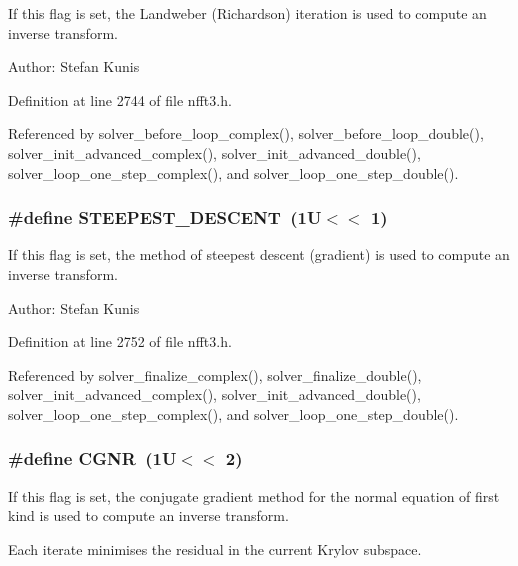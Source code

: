 If this flag is set, the Landweber (Richardson) iteration is used to compute an inverse transform. 

\begin{Desc}
\item[Author:]Stefan Kunis \end{Desc}


Definition at line 2744 of file nfft3.h.

Referenced by solver\_\-before\_\-loop\_\-complex(), solver\_\-before\_\-loop\_\-double(), solver\_\-init\_\-advanced\_\-complex(), solver\_\-init\_\-advanced\_\-double(), solver\_\-loop\_\-one\_\-step\_\-complex(), and solver\_\-loop\_\-one\_\-step\_\-double().\hypertarget{group__solver_g1f016d06d661c80eacb5182d80813cd9}{
\subsubsection{\setlength{\rightskip}{0pt plus 5cm}\#define STEEPEST\_\-DESCENT~(1U$<$$<$ 1)}}
\label{group__solver_g1f016d06d661c80eacb5182d80813cd9}


If this flag is set, the method of steepest descent (gradient) is used to compute an inverse transform. 

\begin{Desc}
\item[Author:]Stefan Kunis \end{Desc}


Definition at line 2752 of file nfft3.h.

Referenced by solver\_\-finalize\_\-complex(), solver\_\-finalize\_\-double(), solver\_\-init\_\-advanced\_\-complex(), solver\_\-init\_\-advanced\_\-double(), solver\_\-loop\_\-one\_\-step\_\-complex(), and solver\_\-loop\_\-one\_\-step\_\-double().\hypertarget{group__solver_g5716b96b5141dfb52b747a78b11defa7}{
\subsubsection{\setlength{\rightskip}{0pt plus 5cm}\#define CGNR~(1U$<$$<$ 2)}}
\label{group__solver_g5716b96b5141dfb52b747a78b11defa7}


If this flag is set, the conjugate gradient method for the normal equation of first kind is used to compute an inverse transform. 

Each iterate minimises the residual in the current Krylov subspace.

